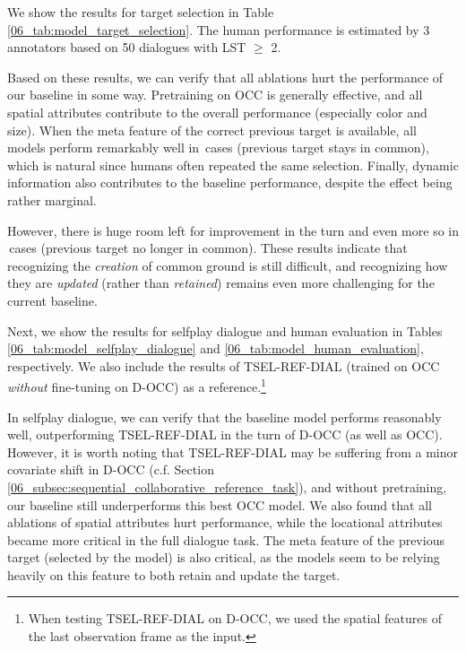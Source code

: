 We show the results for target selection in Table \ref{06_tab:model_target_selection}. The human performance is estimated by 3 annotators based on 50 dialogues with LST $\geq$ 2.

Based on these results, we can verify that all ablations hurt the performance of our baseline in some way. Pretraining on OCC is generally effective, and all spatial attributes contribute to the overall performance (especially color and size). When the meta feature of the correct previous target is available, all models perform remarkably well in \cmark\,cases (previous target stays in common), which is natural since humans often repeated the same selection. Finally, dynamic information also contributes to the baseline performance, despite the effect being rather marginal.

However, there is huge room left for improvement in the  turn and even more so in \xmark\,cases (previous target no longer in common). These results indicate that recognizing the \textit{creation} of common ground is still difficult, and recognizing how they are \textit{updated} (rather than \textit{retained}) remains even more challenging for the current baseline.

Next, we show the results for selfplay dialogue and human evaluation in Tables \ref{06_tab:model_selfplay_dialogue} and \ref{06_tab:model_human_evaluation}, respectively. We also include the results of TSEL-REF-DIAL (trained on OCC \textit{without} fine-tuning on D-OCC) as a reference.\footnote{When testing TSEL-REF-DIAL on D-OCC, we used the spatial features of the last observation frame as the input.}

In selfplay dialogue, we can verify that the baseline model performs reasonably well, outperforming TSEL-REF-DIAL in the  turn of D-OCC (as well as OCC). However, it is worth noting that TSEL-REF-DIAL may be suffering from a minor covariate shift in D-OCC (c.f. Section \ref{06_subsec:sequential_collaborative_reference_task}), and without pretraining, our baseline still underperforms this best OCC model. We also found that all ablations of spatial attributes hurt performance, while the locational attributes became more critical in the full dialogue task. The meta feature of the previous target (selected by the model) is also critical, as the models seem to be relying heavily on this feature to both retain and update the target.


